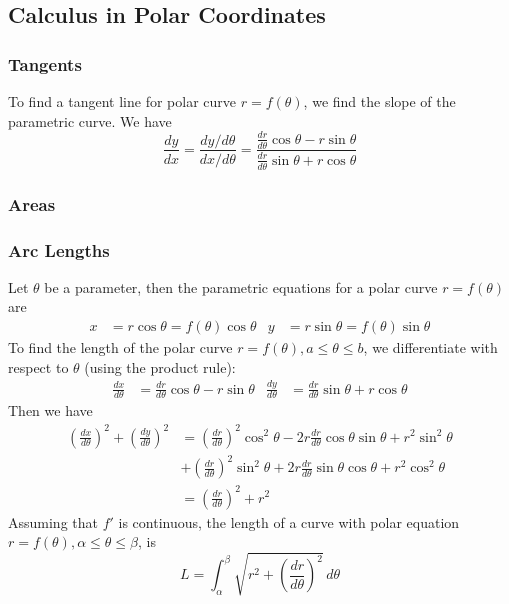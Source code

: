 \subsection{Calculus in Polar Coordinates}

\subsubsection*{Tangents}
To find a tangent line for polar curve \(r=f(\theta)\),
we find the slope of the parametric curve.
We have
\[\frac{dy}{dx}=\frac{dy/d\theta}{dx/d\theta}
=\frac{\frac{dr}{d\theta}\cos\theta-r\sin\theta}
{\frac{dr}{d\theta}\sin\theta+r\cos\theta}\]

\subsubsection*{Areas}

\subsubsection*{Arc Lengths}
Let \(\theta\) be a parameter, then the parametric equations for a polar curve
\(r=f(\theta)\) are
\begin{align*}
    x &= r\cos\theta=f(\theta)\cos\theta & y &= r\sin\theta=f(\theta)\sin\theta
\end{align*}
To find the length of the polar curve \(r=f(\theta),a\leq\theta\leq b\),
we differentiate with respect to \(\theta\) (using the product rule):
\begin{align*}
    \frac{dx}{d\theta} &= \frac{dr}{d\theta}\cos\theta-r\sin\theta
    & \frac{dy}{d\theta} &= \frac{dr}{d\theta}\sin\theta+r\cos\theta
\end{align*}
Then we have
\begin{align*}
    \left(\frac{dx}{d\theta}\right)^2+\left(\frac{dy}{d\theta}\right)^2
    &= \left(\frac{dr}{d\theta}\right)^2\cos^2\theta
    -2r\frac{dr}{d\theta}\cos\theta\sin\theta+r^2\sin^2\theta \\
    &+ \left(\frac{dr}{d\theta}\right)^2\sin^2\theta
    +2r\frac{dr}{d\theta}\sin\theta\cos\theta+r^2\cos^2\theta \\
    &= \left(\frac{dr}{d\theta}\right)^2+r^2
\end{align*}
Assuming that \(f'\) is continuous, the length of a curve with polar equation
\(r=f(\theta),\alpha\leq\theta\leq\beta\), is
\[L
=\int_{\alpha}^{\beta}\sqrt{r^2+\left(\frac{dr}{d\theta}\right)^2}\,d\theta\]
